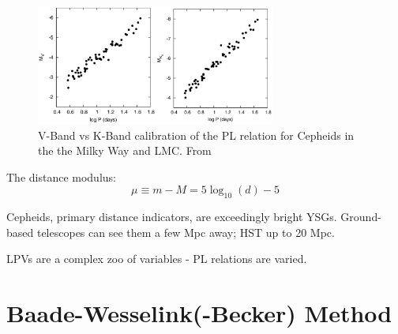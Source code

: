 \documentclass{spy}
\begin{document}
\begin{figure}[ht]
    \centering
    \includegraphics[width=0.7\textwidth]{fouque_cepheid.eps}
    \caption{V-Band vs K-Band calibration of the PL relation for Cepheids in the the Milky Way and LMC. From \citet{fouqueNewCalibrationGalactic2007}}   
    \label{fouque_cepheid}
\end{figure}

The distance modulus:
\begin{equation}
\mu \equiv m-M = 5\log_\mathrm{10}(d) - 5
\end{equation}

Cepheids, primary distance indicators, are exceedingly bright YSGs. Ground-based telescopes can see them a few Mpc away; HST up to 20 Mpc. 

LPVs are a complex zoo of variables - PL relations are varied. 

\section{Baade-Wesselink(-Becker) Method}
\end{document}
